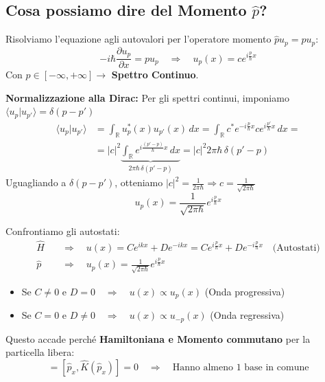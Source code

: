 \documentclass[11pt, a4paper]{article}
\begin{document}
\subsection{Cosa possiamo dire del Momento $\hat{p}$?} %

Risolviamo l'equazione agli autovalori per l'operatore momento $\hat{p} u_p = p u_p$: %
\begin{equation*}
    -i\hbar \frac{\partial u_p}{\partial x} = p u_p \quad \Rightarrow \quad u_p(x) = c e^{i\frac{p}{\hbar}x} %
\end{equation*}
Con $p \in [-\infty, +\infty] \rightarrow$ \textbf{Spettro Continuo}. %

\noindent
\textbf{Normalizzazione alla Dirac:} Per gli spettri continui, imponiamo $\langle u_p | u_{p'} \rangle = \delta(p - p')$ %
\begin{align*}
    \langle u_p | u_{p'} \rangle &= \int_{\mathbb{R}} u_p^*(x) u_{p'}(x) \, dx = \int_{\mathbb{R}} c^* e^{-i\frac{p}{\hbar}x} c e^{i\frac{p'}{\hbar}x} \, dx = \\ %
    &= |c|^2 \underbrace{ \int_{\mathbb{R}} e^{i\frac{(p' - p)}{\hbar}x} \, dx }_{2\pi\hbar \, \delta(p' - p)} = |c|^2 2\pi\hbar \, \delta(p' - p) %
\end{align*}
Uguagliando a $\delta(p - p')$, otteniamo $|c|^2 = \frac{1}{2\pi\hbar} \Rightarrow c = \frac{1}{\sqrt{2\pi\hbar}}$ %
\begin{equation}
    u_p(x) = \frac{1}{\sqrt{2\pi\hbar}} e^{i\frac{p}{\hbar}x} %
\end{equation}

Confrontiamo gli autostati: %
\begin{align*}
    \hat{H} \quad &\Rightarrow \quad u(x) = C e^{ikx} + D e^{-ikx} = C e^{i\frac{p}{\hbar}x} + D e^{-i\frac{p}{\hbar}x} \quad \text{(Autostati)} \\ %
    \hat{p} \quad &\Rightarrow \quad u_p(x) = \frac{1}{\sqrt{2\pi\hbar}} e^{i\frac{p}{\hbar}x} %
\end{align*}
\begin{itemize}
    \item Se $C \neq 0$ e $D = 0 \quad \Rightarrow \quad u(x) \propto u_p(x)$ (Onda progressiva) %
    \item Se $C = 0$ e $D \neq 0 \quad \Rightarrow \quad u(x) \propto u_{-p}(x)$ (Onda regressiva) %
\end{itemize}

Questo accade perché \textbf{Hamiltoniana e Momento commutano} per la particella libera: %
\begin{equation*}
    [\hat{p}_x, \hat{H}] = [\hat{p}_x, \hat{K}(\hat{p}_x)] = 0 \quad \Rightarrow \quad \text{Hanno almeno 1 base in comune} %
\end{equation*}
\end{document}
